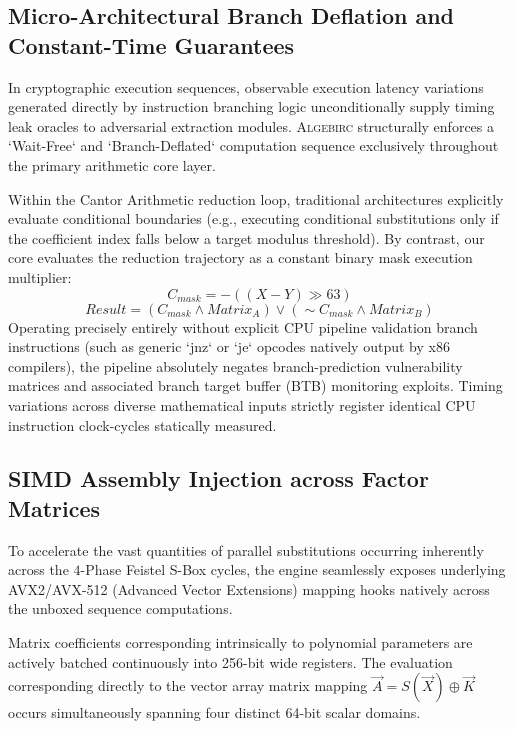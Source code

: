 \subsection{Micro-Architectural Branch Deflation and Constant-Time Guarantees}
In cryptographic execution sequences, observable execution latency variations generated directly by instruction branching logic unconditionally supply timing leak oracles to adversarial extraction modules. \textsc{Algebirc} structurally enforces a `Wait-Free` and `Branch-Deflated` computation sequence exclusively throughout the primary arithmetic core layer.

Within the Cantor Arithmetic reduction loop, traditional architectures explicitly evaluate conditional boundaries (e.g., executing conditional substitutions only if the coefficient index falls below a target modulus threshold). By contrast, our core evaluates the reduction trajectory as a constant binary mask execution multiplier:
\begin{equation}
    C_{mask} = -((X - Y) \gg 63) 
\end{equation}
\begin{equation}
    Result = (C_{mask} \land Matrix_{A}) \lor (\sim C_{mask} \land Matrix_{B})
\end{equation}
Operating precisely entirely without explicit CPU pipeline validation branch instructions (such as generic `jnz` or `je` opcodes natively output by x86 compilers), the pipeline absolutely negates branch-prediction vulnerability matrices and associated branch target buffer (BTB) monitoring exploits. Timing variations across diverse mathematical inputs strictly register identical CPU instruction clock-cycles statically measured. 

\subsection{SIMD Assembly Injection across Factor Matrices}
To accelerate the vast quantities of parallel substitutions occurring inherently across the $4$-Phase Feistel S-Box cycles, the engine seamlessly exposes underlying AVX2/AVX-512 (Advanced Vector Extensions) mapping hooks natively across the unboxed sequence computations.

Matrix coefficients corresponding intrinsically to polynomial parameters are actively batched continuously into 256-bit wide registers. The evaluation corresponding directly to the vector array matrix mapping $\Vec{A} = S(\Vec{X}) \oplus \Vec{K}$ occurs simultaneously spanning four distinct 64-bit scalar domains.


